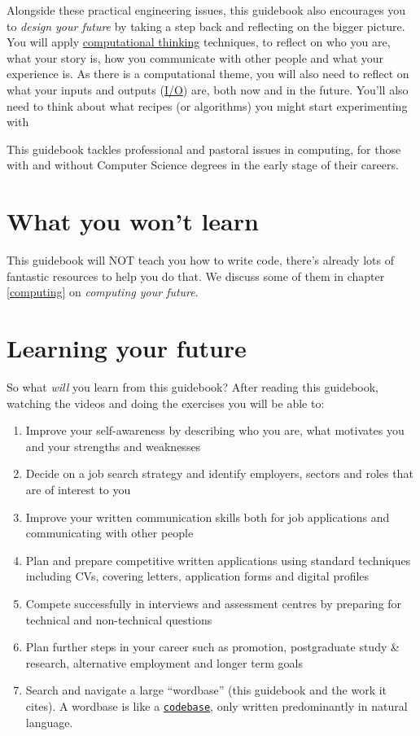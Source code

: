 \documentclass[
]{book}
\providecommand{\tightlist}{%
  \setlength{\itemsep}{0pt}\setlength{\parskip}{0pt}}
\begin{document}
Alongside these practical engineering issues, this guidebook also encourages you to \emph{design your future} by taking a step back and reflecting on the bigger picture. You will apply \href{https://en.wikipedia.org/wiki/Computational_thinking}{computational thinking} techniques, to reflect on who you are, what your story is, how you communicate with other people and what your experience is. As there is a computational theme, you will also need to reflect on what your inputs and outputs (\href{https://en.wikipedia.org/wiki/Input/output}{I/O}) are, both now and in the future. You'll also need to think about what recipes (or algorithms) you might start experimenting with

This guidebook tackles professional and pastoral issues in computing, for those with and without Computer Science degrees in the early stage of their careers.

\hypertarget{nilo}{%
\section{What you won't learn}\label{nilo}}

This guidebook will NOT teach you how to write code, there's already lots of fantastic resources to help you do that. We discuss some of them in chapter \ref{computing} on \emph{computing your future}.

\hypertarget{bilo}{%
\section{Learning your future}\label{bilo}}

So what \emph{will} you learn from this guidebook? After reading this guidebook, watching the videos and doing the exercises you will be able to:

\begin{enumerate}
\def\labelenumi{\arabic{enumi}.}
\tightlist
\item
  Improve your self-awareness by describing who you are, what motivates you and your strengths and weaknesses
\item
  Decide on a job search strategy and identify employers, sectors and roles that are of interest to you\\
\item
  Improve your written communication skills both for job applications and communicating with other people
\item
  Plan and prepare competitive written applications using standard techniques including CVs, covering letters, application forms and digital profiles
\item
  Compete successfully in interviews and assessment centres by preparing for technical and non-technical questions
\item
  Plan further steps in your career such as promotion, postgraduate study \& research, alternative employment and longer term goals
\item
  Search and navigate a large ``wordbase'' (this guidebook and the work it cites). A wordbase is like a \href{https://en.wikipedia.org/wiki/Codebase}{\texttt{codebase}}, only written predominantly in natural language.
\end{enumerate}
\end{document}
